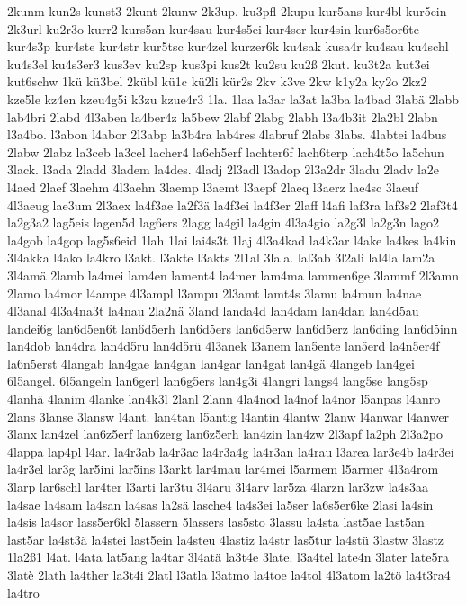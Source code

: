 {2kunm
kun2s
kunst3
2kunt
2kunw
2k3up.
ku3pfl
2kupu
kur5ans
kur4bl
kur5ein
2k3url
ku2r3o
kurr2
kurs5an
kur4sau
kur4s5ei
kur4ser
kur4sin
kur6s5or6te
kur4s3p
kur4ste
kur4str
kur5tsc
kur4zel
kurzer6k
ku4sak
kusa4r
ku4sau
ku4schl
ku4s3el
ku4s3er3
kus3ev
ku2sp
kus3pi
kus2t
ku2su
ku2ß
2kut.
ku3t2a
kut3ei
kut6schw
1kü
kü3bel
2kübl
kü1c
kü2li
kür2s
2kv
k3ve
2kw
k1y2a
ky2o
2kz2
kze5le
kz4en
kzeu4g5i
k3zu
kzue4r3
1la.
1laa
la3ar
la3at
la3ba
la4bad
3labä
2labb
lab4bri
2labd
4l3aben
la4ber4z
la5bew
2labf
2labg
2labh
l3a4b3it
2la2bl
2labn
l3a4bo.
l3abon
l4abor
2l3abp
la3b4ra
lab4res
4labruf
2labs
3labs.
4labtei
la4bus
2labw
2labz
la3ceb
la3cel
lacher4
la6ch5erf
lachter6f
lach6terp
lach4t5o
la5chun
3lack.
l3ada
2ladd
3ladem
la4des.
4ladj
2l3adl
l3adop
2l3a2dr
3ladu
2ladv
la2e
l4aed
2laef
3laehm
4l3aehn
3laemp
l3aemt
l3aepf
2laeq
l3aerz
lae4sc
3laeuf
4l3aeug
lae3um
2l3aex
la4f3ae
la2f3ä
la4f3ei
la4f3er
2laff
l4afi
laf3ra
laf3s2
2laf3t4
la2g3a2
lag5eis
lagen5d
lag6ers
2lagg
la4gil
la4gin
4l3a4gio
la2g3l
la2g3n
lago2
la4gob
la4gop
lag5s6eid
1lah
1lai
lai4s3t
1laj
4l3a4kad
la4k3ar
l4ake
la4kes
la4kin
3l4akka
l4ako
la4kro
l3akt.
l3akte
l3akts
2l1al
3lala.
lal3ab
3l2ali
lal4la
lam2a
3l4amä
2lamb
la4mei
lam4en
lament4
la4mer
lam4ma
lammen6ge
3lammf
2l3amn
2lamo
la4mor
l4ampe
4l3ampl
l3ampu
2l3amt
lamt4s
3lamu
la4mun
la4nae
4l3anal
4l3a4na3t
la4nau
2la2nä
3land
landa4d
lan4dam
lan4dan
lan4d5au
landei6g
lan6d5en6t
lan6d5erh
lan6d5ers
lan6d5erw
lan6d5erz
lan6ding
lan6d5inn
lan4dob
lan4dra
lan4d5ru
lan4d5rü
4l3anek
l3anem
lan5ente
lan5erd
la4n5er4f
la6n5erst
4langab
lan4gae
lan4gan
lan4gar
lan4gat
lan4gä
4langeb
lan4gei
6l5angel.
6l5angeln
lan6gerl
lan6g5ers
lan4g3i
4langri
langs4
lang5se
lang5sp
4lanhä
4lanim
4lanke
lan4k3l
2lanl
2lann
4la4nod
la4nof
la4nor
l5anpas
l4anro
2lans
3lanse
3lansw
l4ant.
lan4tan
l5antig
l4antin
4lantw
2lanw
l4anwar
l4anwer
3lanx
lan4zel
lan6z5erf
lan6zerg
lan6z5erh
lan4zin
lan4zw
2l3apf
la2ph
2l3a2po
4lappa
lap4pl
l4ar.
la4r3ab
la4r3ac
la4r3a4g
la4r3an
la4rau
l3area
lar3e4b
la4r3ei
la4r3el
lar3g
lar5ini
lar5ins
l3arkt
lar4mau
lar4mei
l5armem
l5armer
4l3a4rom
3larp
lar6schl
lar4ter
l3arti
lar3tu
3l4aru
3l4arv
lar5za
4larzn
lar3zw
la4s3aa
la4sae
la4sam
la4san
la4sas
la2sä
lasche4
la4s3ei
la5ser
la6s5er6ke
2lasi
la4sin
la4sis
la4sor
lass5er6kl
5lassern
5lassers
las5sto
3lassu
la4sta
last5ae
last5an
last5ar
la4st3ä
la4stei
last5ein
la4steu
4lastiz
la4str
las5tur
la4stü
3lastw
3lastz
1la2ß1
l4at.
l4ata
lat5ang
la4tar
3l4atä
la3t4e
3late.
l3a4tel
late4n
3later
late5ra
3latè
2lath
la4ther
la3t4i
2latl
l3atla
l3atmo
la4toe
la4tol
4l3atom
la2tö
la4t3ra4
la4tro
}
